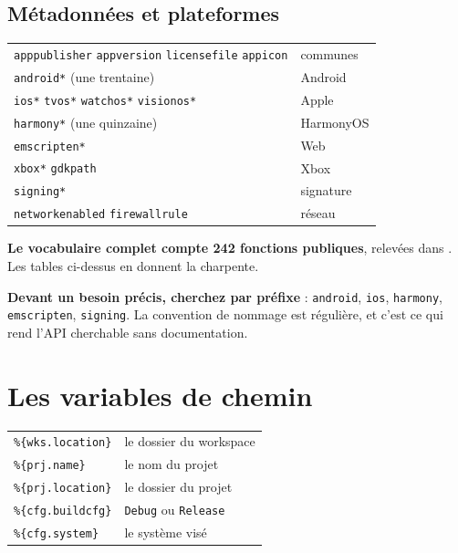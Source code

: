 \subsection*{Métadonnées et plateformes}

\begin{center}
\begin{tabular}{@{}ll@{}}
\toprule
\texttt{apppublisher} \texttt{appversion} \texttt{licensefile} \texttt{appicon} & communes \\
\texttt{android*} (une trentaine) & Android \\
\texttt{ios*} \texttt{tvos*} \texttt{watchos*} \texttt{visionos*} & Apple \\
\texttt{harmony*} (une quinzaine) & HarmonyOS \\
\texttt{emscripten*} & Web \\
\texttt{xbox*} \texttt{gdkpath} & Xbox \\
\texttt{signing*} & signature \\
\texttt{networkenabled} \texttt{firewallrule} & réseau \\
\bottomrule
\end{tabular}
\end{center}

\begin{nkretenir}
\textbf{Le vocabulaire complet compte 242 fonctions publiques}, relevées dans
. Les tables ci-dessus en donnent la charpente.

\textbf{Devant un besoin précis, cherchez par préfixe} : \texttt{android},
\texttt{ios}, \texttt{harmony}, \texttt{emscripten}, \texttt{signing}. La
convention de nommage est régulière, et c'est ce qui rend l'API cherchable sans
documentation.
\end{nkretenir}

\section{Les variables de chemin}

\begin{center}
\begin{tabular}{@{}ll@{}}
\toprule
\texttt{\%\{wks.location\}} & le dossier du workspace \\
\texttt{\%\{prj.name\}} & le nom du projet \\
\texttt{\%\{prj.location\}} & le dossier du projet \\
\texttt{\%\{cfg.buildcfg\}} & \texttt{Debug} ou \texttt{Release} \\
\texttt{\%\{cfg.system\}} & le système visé \\
\bottomrule
\end{tabular}
\end{center}

